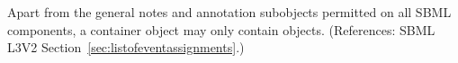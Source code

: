 Apart from the general notes and annotation subobjects permitted on all
SBML components, a \ListOfEventAssignments container object may only
contain \EventAssignment objects.  (References: SBML L3V2
Section~\ref{sec:listofeventassignments}.)
